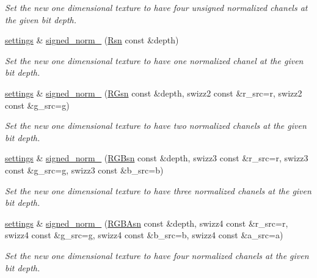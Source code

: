 \begin{DoxyCompactItemize}
\begin{DoxyCompactList}\small\item\em Set the new one dimensional texture to have four unsigned normalized chanels at the given bit depth. \end{DoxyCompactList}\item 
\hyperlink{classgfx_1_1texture__1D_1_1settings}{settings} \& \hyperlink{classgfx_1_1texture__1D_1_1settings_ab60d0f897f3b327de0868f5422be7ad5}{signed\-\_\-norm\-\_} (\hyperlink{classgfx_1_1Rsn}{Rsn} const \&depth)
\begin{DoxyCompactList}\small\item\em Set the new one dimensional texture to have one normalized chanel at the given bit depth. \end{DoxyCompactList}\item 
\hyperlink{classgfx_1_1texture__1D_1_1settings}{settings} \& \hyperlink{classgfx_1_1texture__1D_1_1settings_ac50d04698bd03eab8f2d1ed96a04ba52}{signed\-\_\-norm\-\_} (\hyperlink{classgfx_1_1RGsn}{R\-Gsn} const \&depth, swizz2 const \&r\-\_\-src=r, swizz2 const \&g\-\_\-src=g)
\begin{DoxyCompactList}\small\item\em Set the new one dimensional texture to have two normalized chanels at the given bit depth. \end{DoxyCompactList}\item 
\hyperlink{classgfx_1_1texture__1D_1_1settings}{settings} \& \hyperlink{classgfx_1_1texture__1D_1_1settings_ad3815e6ef7931e30ab0c60b66c0037ca}{signed\-\_\-norm\-\_} (\hyperlink{classgfx_1_1RGBsn}{R\-G\-Bsn} const \&depth, swizz3 const \&r\-\_\-src=r, swizz3 const \&g\-\_\-src=g, swizz3 const \&b\-\_\-src=b)
\begin{DoxyCompactList}\small\item\em Set the new one dimensional texture to have three normalized chanels at the given bit depth. \end{DoxyCompactList}\item 
\hyperlink{classgfx_1_1texture__1D_1_1settings}{settings} \& \hyperlink{classgfx_1_1texture__1D_1_1settings_abff74d2301777b2585ef0475c431debb}{signed\-\_\-norm\-\_} (\hyperlink{classgfx_1_1RGBAsn}{R\-G\-B\-Asn} const \&depth, swizz4 const \&r\-\_\-src=r, swizz4 const \&g\-\_\-src=g, swizz4 const \&b\-\_\-src=b, swizz4 const \&a\-\_\-src=a)
\begin{DoxyCompactList}\small\item\em Set the new one dimensional texture to have four normalized chanels at the given bit depth. \end{DoxyCompactList}\item 

\end{DoxyCompactItemize}
